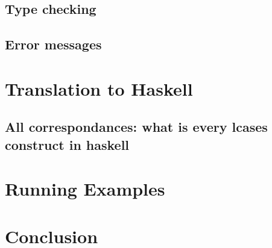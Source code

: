 \documentclass{article}
\def\H{Haskell}
\begin{document}
\subsection{Type checking}

\subsection{Error messages}

\section{Translation to \H}

\subsection{All correspondances: what is every lcases construct in haskell}

\section{Running Examples}

\section{Conclusion}

\newpage
\printbibliography
\end{document}
